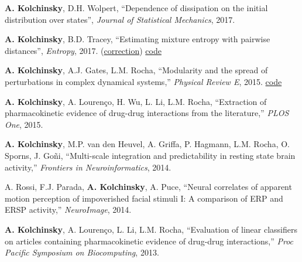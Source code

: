 \textbf{A. Kolchinsky}, D.H. Wolpert, ``Dependence of dissipation on the initial distribution over states'',
\emph{Journal of Statistical Mechanics}, 2017. 
  

\textbf{A. Kolchinsky}, B.D. Tracey, ``Estimating mixture entropy with pairwise distances'', \emph{Entropy}, 2017.
(\href{https://www.mdpi.com/1099-4300/19/11/588}{correction}) 
\href{https://github.com/btracey/mixent/}{code} 


\textbf{A. Kolchinsky}, A.J. Gates, L.M. Rocha, ``Modularity and
the spread of perturbations in complex dynamical systems,'' \emph{Physical Review E}, 2015. 
\href{https://github.com/artemyk/perturbationmodularity/}{code} 

\textbf{A. Kolchinsky}, A. Lourenço, H. Wu, L. Li, L.M. Rocha,
``Extraction of pharmacokinetic evidence of drug-drug interactions
from the literature,'' \emph{PLOS One}, 2015. 
 

\textbf{A. Kolchinsky}, M.P. van den Heuvel, A. Griffa, P. Hagmann, L.M. Rocha, O. Sporns, J. Goñi, ``Multi-scale
integration and predictability in resting state brain activity,'' 
\emph{Frontiers in Neuroinformatics}, 2014. 
 

A. Rossi, F.J. Parada, \textbf{A. Kolchinsky}, A. Puce, ``Neural correlates of apparent motion perception of impoverished facial stimuli I: A comparison of ERP and ERSP activity,'' \emph{NeuroImage}, 2014. 
 

\textbf{A. Kolchinsky}, A. Lourenço, L. Li, L.M. Rocha, ``Evaluation of linear classifiers on articles containing pharmacokinetic evidence of drug-drug interactions,'' \emph{Proc Pacific Symposium on Biocomputing}, 2013. 
 

